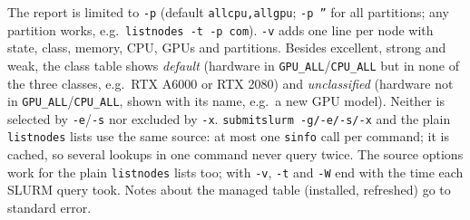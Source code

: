 \documentclass[11pt,a4paper]{article}
\newcommand{\cmd}[1]{\texttt{#1}}
\begin{document}
\begin{description}[style=nextline,leftmargin=1.5em]
    The report is limited to \cmd{-p} (default \cmd{allcpu,allgpu}; \cmd{-p ''} for all
    partitions; any partition works, e.g.\ \cmd{listnodes -t -p com}). \cmd{-v} adds one line per
    node with state, class, memory, CPU, GPUs and partitions.
    Besides excellent, strong and weak, the class table shows \emph{default} (hardware in
    \cmd{GPU\_ALL}/\cmd{CPU\_ALL} but in none of the three classes, e.g.\ RTX A6000 or RTX 2080) and
    \emph{unclassified} (hardware not in \cmd{GPU\_ALL}/\cmd{CPU\_ALL}, shown with its name, e.g.\ a
    new GPU model). Neither is selected by \cmd{-e}/\cmd{-s} nor excluded by \cmd{-x}. \cmd{submitslurm -g/-e/-s/-x} and the plain \cmd{listnodes} lists use the same source: at
    most one \cmd{sinfo} call per command; it is cached, so
    several lookups in one command never query twice. The source options work for the plain
    \cmd{listnodes} lists too; with \cmd{-v}, \cmd{-t} and \cmd{-W} end with the time each SLURM
    query took. Notes about the managed table (installed, refreshed) go to standard error.


\end{description}
\end{document}
